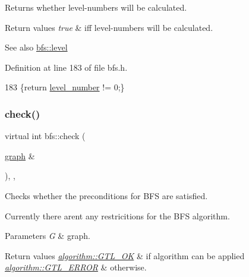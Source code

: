 Returns whether level-\/numbers will be calculated. 


\begin{DoxyRetVals}{Return values}
{\em true} & iff level-\/numbers will be calculated. \\
\hline
\end{DoxyRetVals}
\begin{DoxySeeAlso}{See also}
\mbox{\hyperlink{classbfs_ac0158a0453fb17a89be4049d21db56b1}{bfs\+::level}} 
\end{DoxySeeAlso}


Definition at line 183 of file bfs.\+h.


\begin{DoxyCode}
183 \{\textcolor{keywordflow}{return} \mbox{\hyperlink{classbfs_aab92e9d128612c28324aafe4750dbc84}{level\_number}} != 0;\}
\end{DoxyCode}
\mbox{\label{classbfs_aafdf63b57eaceb5d95f441be0f9c77bb}} 
\subsubsection{\texorpdfstring{check()}{check()}}
{\footnotesize\ttfamily virtual int bfs\+::check (\begin{DoxyParamCaption}\item[{\mbox{\hyperlink{classgraph}{graph}} \&}]{ }\end{DoxyParamCaption})\hspace{0.3cm}{\ttfamily [inline]}, {\ttfamily [virtual]}, {\ttfamily [inherited]}}



Checks whether the preconditions for B\+FS are satisfied. 

Currently there aren\textquotesingle{}t any restricitions for the B\+FS algorithm.


\begin{DoxyParams}{Parameters}
{\em G} & graph. \\
\hline
\end{DoxyParams}

\begin{DoxyRetVals}{Return values}
{\em \mbox{\hyperlink{classalgorithm_af1a0078e153aa99c24f9bdf0d97f6710a5114c20e4a96a76b5de9f28bf15e282b}{algorithm\+::\+G\+T\+L\+\_\+\+OK}}} & if algorithm can be applied \\
\hline
{\em \mbox{\hyperlink{classalgorithm_af1a0078e153aa99c24f9bdf0d97f6710a6fcf574690bbd6cf710837a169510dd7}{algorithm\+::\+G\+T\+L\+\_\+\+E\+R\+R\+OR}}} & otherwise. \\
\hline
\end{DoxyRetVals}


